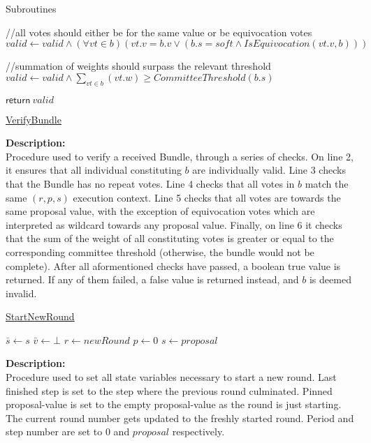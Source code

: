 \documentclass[10pt,a4paper]{article}
\begin{document}
\begin{section}{Subroutines}
\begin{algorithm}[H]
\begin{algorithmic}[1]
    //all votes should either be for the same value or be equivocation votes
    \State $valid \gets valid \land (\forall vt \in b)(vt.v = b.v \lor (b.s = soft \land IsEquivocation(vt.v, b)))$

    //summation of weights should surpass the relevant threshold
    \State $valid \gets valid \land  \sum_{vt \in b}(vt.w) \geq CommitteeThreshold(b.s)$

    \State $\mathsf{return} \ valid$

    \EndFunction
    \end{algorithmic}
    \caption{\underline{VerifyBundle}}
\end{algorithm}

\noindent \textbf{Description:}\\
Procedure used to verify a received Bundle, through a series 
of checks.
On line 2, it ensures that all individual constituting $b$
are individually valid.
Line 3 checks that the Bundle has no repeat votes.
Line 4 checks that all votes in $b$ match the same $(r,p,s)$
execution context.
Line 5 checks that all votes are towards the same proposal value,
with the exception of equivocation votes which are interpreted as wildcard
towards any proposal value.
Finally, on line 6 it checks that the sum of the weight of all constituting
votes is greater or equal to the corresponding committee threshold (otherwise, 
the bundle would not be complete).
After all aformentioned checks have passed, a boolean true value is returned.
If any of them failed, a false value is returned instead, and $b$ is deemed invalid.


\begin{algorithm}[H]\label{algo:start-new-round}
    \caption{\underline{StartNewRound}}
    \label{algo:start-new-round}
    \begin{algorithmic}[1]
    \State $\bar{s} \gets s$
    \State $\bar{v} \gets \bot$
    \State $r \gets newRound$
    \State $p \gets 0$
    \State $s \gets proposal$
    \EndFunction
    \end{algorithmic}
\end{algorithm}

\noindent \textbf{Description:}\\
Procedure used to set all state variables necessary to start a new round.
Last finished step is set to the step where the previous round culminated.
Pinned proposal-value is set to the empty proposal-value as the round is just starting.
The current round number gets updated to the freshly started round.
Period and step number are set to $0$ and $proposal$ respectively.


\end{section}
\end{document}
